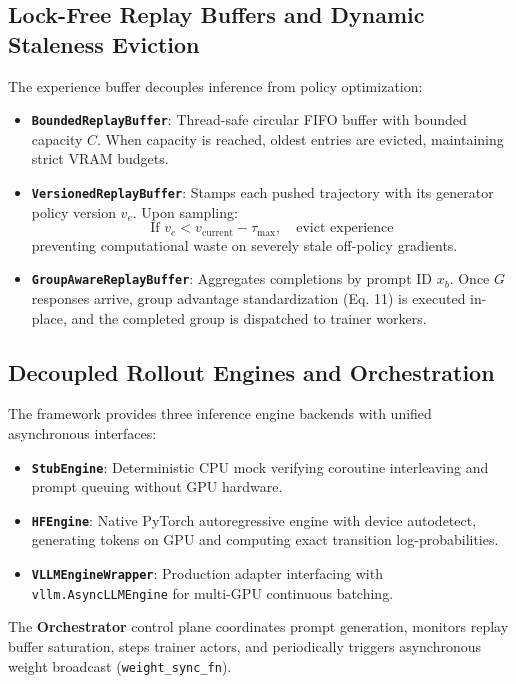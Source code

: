 \documentclass[10pt,twocolumn,letterpaper]{article}
\begin{document}
\subsection{Lock-Free Replay Buffers and Dynamic Staleness Eviction}

The experience buffer decouples inference from policy optimization:
\begin{itemize}
    \item \textbf{\texttt{BoundedReplayBuffer}}: Thread-safe circular FIFO buffer with bounded capacity $C$. When capacity is reached, oldest entries are evicted, maintaining strict VRAM budgets.
    \item \textbf{\texttt{VersionedReplayBuffer}}: Stamps each pushed trajectory with its generator policy version $v_e$. Upon sampling:
    \begin{equation}
        \text{If } v_e < v_{\text{current}} - \tau_{\text{max}}, \quad \text{evict experience}
    \end{equation}
    preventing computational waste on severely stale off-policy gradients.
    \item \textbf{\texttt{GroupAwareReplayBuffer}}: Aggregates completions by prompt ID $x_b$. Once $G$ responses arrive, group advantage standardization (Eq. 11) is executed in-place, and the completed group is dispatched to trainer workers.
\end{itemize}

\subsection{Decoupled Rollout Engines and Orchestration}

The framework provides three inference engine backends with unified asynchronous interfaces:
\begin{itemize}
    \item \textbf{\texttt{StubEngine}}: Deterministic CPU mock verifying coroutine interleaving and prompt queuing without GPU hardware.
    \item \textbf{\texttt{HFEngine}}: Native PyTorch autoregressive engine with device autodetect, generating tokens on GPU and computing exact transition log-probabilities.
    \item \textbf{\texttt{VLLMEngineWrapper}}: Production adapter interfacing with \texttt{vllm.AsyncLLMEngine} for multi-GPU continuous batching.
\end{itemize}

The \textbf{Orchestrator} control plane coordinates prompt generation, monitors replay buffer saturation, steps trainer actors, and periodically triggers asynchronous weight broadcast (\texttt{weight\_sync\_fn}).
\end{document}
